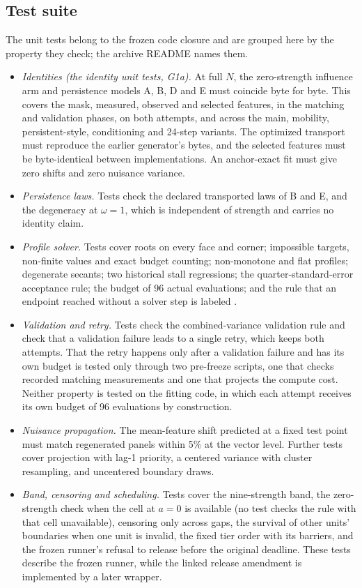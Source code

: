 \subsection{Test suite}

The unit tests belong to the frozen code closure and are grouped here by the property they check; the archive README names them.
\begin{itemize}
\item \emph{Identities (the identity unit tests, G1a).} At full $N$, the zero-strength influence arm and persistence models A, B, D and E must coincide byte for byte. This covers the mask, measured, observed and selected features, in the matching and validation phases, on both attempts, and across the main, mobility, persistent-style, conditioning and 24-step variants. The optimized transport must reproduce the earlier generator's bytes, and the selected features must be byte-identical between implementations. An anchor-exact fit must give zero shifts and zero nuisance variance.
\item \emph{Persistence laws.} Tests check the declared transported laws of B and E, and the degeneracy at $\omega=1$, which is independent of strength and carries no identity claim.
\item \emph{Profile solver.} Tests cover roots on every face and corner; impossible targets, non-finite values and exact budget counting; non-monotone and flat profiles; degenerate secants; two historical stall regressions; the quarter-standard-error acceptance rule; the budget of 96 actual evaluations; and the rule that an endpoint reached without a solver step is labeled .
\item \emph{Validation and retry.} Tests check the combined-variance validation rule and check that a validation failure leads to a single retry, which keeps both attempts. That the retry happens only after a validation failure and has its own budget is tested only through two pre-freeze scripts, one that checks recorded matching measurements and one that projects the compute cost. Neither property is tested on the fitting code, in which each attempt receives its own budget of 96 evaluations by construction.
\item \emph{Nuisance propagation.} The mean-feature shift predicted at a fixed test point must match regenerated panels within 5\% at the vector level. Further tests cover projection with lag-1 priority, a centered variance with cluster resampling, and uncentered boundary draws.
\item \emph{Band, censoring and scheduling.} Tests cover the nine-strength band, the zero-strength check when the cell at $a=0$ is available (no test checks the rule with that cell unavailable), censoring only across gaps, the survival of other units' boundaries when one unit is invalid, the fixed tier order with its barriers, and the frozen runner's refusal to release before the original deadline. These tests describe the frozen runner, while the linked release amendment is implemented by a later wrapper.

\end{itemize}
